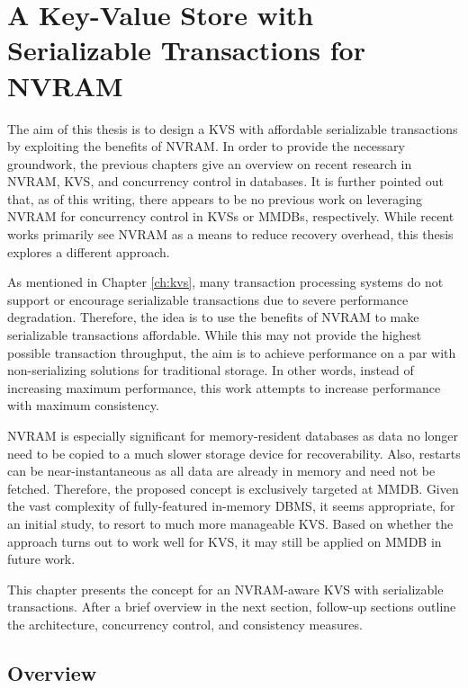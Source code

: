 \chapter{A Key-Value Store with Serializable Transactions for NVRAM}
\label{ch:concept}

The aim of this thesis is to design a \ac{KVS} with affordable serializable
transactions by exploiting the benefits of \ac{NVRAM}. In order to provide the
necessary groundwork, the previous chapters give an overview on recent research
in \ac{NVRAM}, \ac{KVS}, and concurrency control in databases. It is further
pointed out that, as of this writing, there appears to be no previous work on
leveraging \ac{NVRAM} for concurrency control in \acp{KVS} or \acp{MMDB},
respectively. While recent works primarily see \ac{NVRAM} as a means to reduce
recovery overhead, this thesis explores a different approach.

As mentioned in Chapter \ref{ch:kvs}, many transaction processing systems do not
support or encourage serializable transactions due to severe performance
degradation. Therefore, the idea is to use the benefits of \ac{NVRAM} to make
serializable transactions affordable. While this may not provide the highest
possible transaction throughput, the aim is to achieve performance on a par with
non-serializing solutions for traditional storage. In other words, instead of
increasing maximum performance, this work attempts to increase performance with
maximum consistency.

\ac{NVRAM} is especially significant for memory-resident databases as data no
longer need to be copied to a much slower storage device for recoverability.
Also, restarts can be near-instantaneous as all data are already in memory and
need not be fetched. Therefore, the proposed concept is exclusively targeted at
\ac{MMDB}. Given the vast complexity of fully-featured in-memory \ac{DBMS}, it
seems appropriate, for an initial study, to resort to much more manageable
\ac{KVS}. Based on whether the approach turns out to work well for \ac{KVS}, it
may still be applied on \ac{MMDB} in future work.

This chapter presents the concept for an \ac{NVRAM}-aware \ac{KVS} with
serializable transactions. After a brief overview in the next section,
follow-up sections outline the architecture, concurrency control, and
consistency measures.

\section{Overview}
\label{ch:concept-overview}


